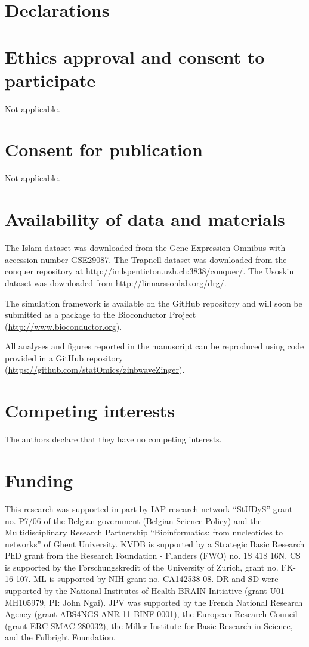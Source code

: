 \documentclass{bmcart}
\begin{document}
\begin{backmatter}
\section*{Declarations}

\section*{Ethics approval and consent to participate}
Not applicable.

\section*{Consent for publication}
Not applicable.

\section*{Availability of data and materials}
The Islam dataset was downloaded from the Gene Expression Omnibus with accession number GSE29087.
The Trapnell dataset was downloaded from the conquer repository \citep{Soneson2017} at \url{http://imlspenticton.uzh.ch:3838/conquer/}.
The Usoskin dataset was downloaded from \url{http://linnarssonlab.org/drg/}. 

The simulation framework is available on the GitHub repository and will soon be submitted as a package to the Bioconductor Project (\url{http://www.bioconductor.org}). 

All analyses and figures reported in the manuscript can be reproduced using code provided in a GitHub repository (\url{https://github.com/statOmics/zinbwaveZinger}). 

\section*{Competing interests}
The authors declare that they have no competing interests.
  
\section*{Funding}
This research was supported in part by IAP research network ``StUDyS'' grant no. P7/06 of the Belgian government (Belgian Science Policy) and the Multidisciplinary Research Partnership ``Bioinformatics: from nucleotides to networks'' of Ghent University. KVDB is supported by a Strategic Basic Research PhD grant from the Research Foundation - Flanders (FWO) no. 1S 418 16N.
CS is supported by the Forschungskredit of the University of Zurich, grant no. FK-16-107. ML is supported by NIH grant no. CA142538-08. DR and SD were supported by the National Institutes of Health BRAIN Initiative (grant U01 MH105979, PI: John Ngai). JPV was supported by the French National Research Agency (grant ABS4NGS ANR-11-BINF-0001), the European Research Council (grant ERC-SMAC-280032), the Miller Institute for Basic Research in Science, and the Fulbright Foundation.
 

\end{backmatter}
\end{document}
